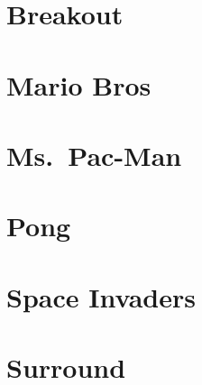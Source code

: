 \clearpage
\begin{landscape}

\section{Breakout}
\label{sec:appendix_additional_results_breakout}


\clearpage
\section{Mario Bros}
\label{sec:appendix_additional_results_mario_bros}


\clearpage
\section{Ms.\ Pac-Man}
\label{sec:appendix_additional_results_ms_pacman}


\clearpage
\section{Pong}
\label{sec:appendix_additional_results_pong}


\clearpage
\section{Space Invaders}
\label{sec:appendix_additional_results_space_invaders}


\clearpage
\section{Surround}
\label{sec:appendix_additional_results_surround}


\end{landscape}

